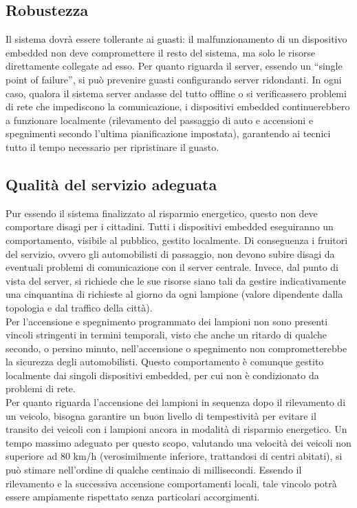 \subsection{Robustezza}
Il sistema dovrà essere tollerante ai guasti: il malfunzionamento di un dispositivo embedded non deve compromettere il resto del sistema, ma solo le risorse direttamente collegate ad esso.
Per quanto riguarda il server, essendo un ``single point of failure'', si può prevenire guasti configurando server ridondanti.
In ogni caso, qualora il sistema server andasse del tutto offline o si verificassero problemi di rete che impediscono la comunicazione, i dispositivi embedded continuerebbero a funzionare localmente (rilevamento del passaggio di auto e accensioni e spegnimenti secondo l'ultima pianificazione impostata), garantendo ai tecnici tutto il tempo necessario per ripristinare il guasto.

\subsection{Qualità del servizio adeguata}
Pur essendo il sistema finalizzato al risparmio energetico, questo non deve comportare disagi per i cittadini.
Tutti i dispositivi embedded eseguiranno un comportamento, visibile al pubblico, gestito localmente.
Di conseguenza i fruitori del servizio, ovvero gli automobilisti di passaggio, non devono subire disagi da eventuali problemi di comunicazione con il server centrale.
Invece, dal punto di vista del server, si richiede che le sue risorse siano tali da gestire indicativamente una cinquantina di richieste al giorno da ogni lampione (valore dipendente dalla topologia e dal traffico della città).
\\Per l'accensione e spegnimento programmato dei lampioni non sono presenti vincoli stringenti in termini temporali, visto che anche un ritardo di qualche secondo, o persino minuto, nell'accensione o spegnimento non comprometterebbe la sicurezza degli automobilisti.
Questo comportamento è comunque gestito localmente dai singoli dispositivi embedded, per cui non è condizionato da problemi di rete.
\\Per quanto riguarda l'accensione dei lampioni in sequenza dopo il rilevamento di un veicolo, bisogna garantire un buon livello di tempestività per evitare il transito dei veicoli con i lampioni ancora in modalità di risparmio energetico.
Un tempo massimo adeguato per questo scopo, valutando una velocità dei veicoli non superiore ad 80 km/h (verosimilmente inferiore, trattandosi di centri abitati), si può stimare nell'ordine di qualche centinaio di millisecondi.
Essendo il rilevamento e la successiva accensione comportamenti locali, tale vincolo potrà essere ampiamente rispettato senza particolari accorgimenti.

